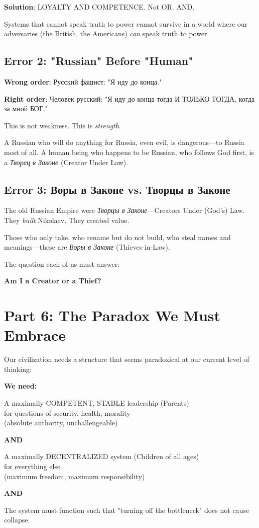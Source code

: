 \documentclass[12pt,a4paper]{article}
\begin{document}
\textbf{Solution}: LOYALTY AND COMPETENCE. Not OR. AND.

Systems that cannot speak truth to power cannot survive in a world where our adversaries (the British, the Americans) \textit{can} speak truth to power.

\subsection{Error 2: "Russian" Before "Human"}

\textbf{Wrong order}: Русский фашист: "Я иду до конца."

\textbf{Right order}: Человек русский: "Я иду до конца тогда И ТОЛЬКО ТОГДА, когда за мной БОГ."

This is not weakness. This is \textit{strength}.

A Russian who will do anything for Russia, even evil, is dangerous—to Russia most of all. A human being who happens to be Russian, who follows God first, is a \textit{Творец в Законе} (Creator Under Law).

\subsection{Error 3: Воры в Законе vs. Творцы в Законе}

The old Russian Empire were \textit{Творцы в Законе}—Creators Under (God's) Law. They \textit{built} Nikolaev. They created value.

Those who only take, who rename but do not build, who steal names and meanings—these are \textit{Воры в Законе} (Thieves-in-Law).

The question each of us must answer:
\begin{center}
\textbf{Am I a Creator or a Thief?}
\end{center}

\section{Part 6: The Paradox We Must Embrace}

Our civilization needs a structure that seems paradoxical at our current level of thinking:

\begin{mdframed}[backgroundcolor=cyan!5]
\textbf{We need:}

A maximally COMPETENT, STABLE leadership (Parents)\\
for questions of security, health, morality\\
(absolute authority, unchallengeable)

\textbf{AND}

A maximally DECENTRALIZED system (Children of all ages)\\
for everything else\\
(maximum freedom, maximum responsibility)

\textbf{AND}

The system must function such that "turning off the bottleneck" does not cause collapse.
\end{mdframed}
\end{document}
